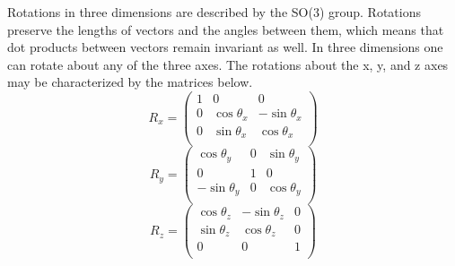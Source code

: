 Rotations in three dimensions are described by the SO(3) group. Rotations preserve the lengths of vectors and the angles between them, which means that dot products between vectors remain invariant as well. In three dimensions one can rotate about any of the three axes. The rotations about the x, y, and z axes may be characterized by the matrices below.
\begin{equation}
R_x = 
\begin{pmatrix}
1 & 0 & 0 \\
0 & \cos\theta_x & -\sin\theta_x \\
0 & \sin\theta_x & \cos\theta_x \\
\end{pmatrix}
\end{equation}
\begin{equation}
R_y = 
\begin{pmatrix}
\cos\theta_y & 0 & \sin\theta_y \\
0 & 1 & 0 \\
-\sin\theta_y & 0 & \cos\theta_y \\
\end{pmatrix}
\end{equation}
\begin{equation}
R_z = 
\begin{pmatrix}
\cos\theta_z & -\sin\theta_z & 0 \\
\sin\theta_z & \cos\theta_z & 0 \\
0 & 0 & 1 \\
\end{pmatrix}
\end{equation}

